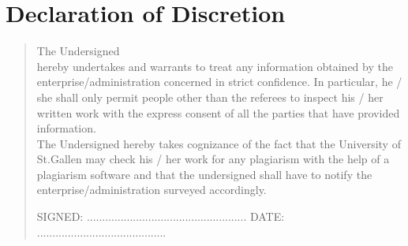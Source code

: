 %
%
%
%
\chapter*{Declaration of Discretion}
\begin{SingleSpace}
\begin{quote}
The Undersigned\\ 

hereby undertakes and warrants to treat any information obtained by the enterprise/administration concerned in strict confidence. In particular, he / she shall only permit people other than the referees to inspect his / her written work with the express consent of all the parties that have provided information. \\

The Undersigned hereby takes cognizance of the fact that the University of St.Gallen may check his / her work for any plagiarism with the help of a plagiarism software and that the undersigned shall have to notify the enterprise/administration surveyed accordingly.

\vspace{1.5cm}
\noindent
\hspace{-0.75cm}\textsc{SIGNED: .................................................... DATE: ..........................................}
\end{quote}
\end{SingleSpace}
\clearpage